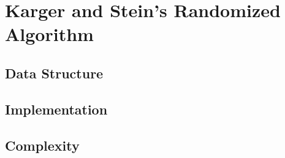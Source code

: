 \section{Karger and Stein's Randomized Algorithm}\label{karger}


\subsection{Data Structure}


\subsection{Implementation}



\subsection{Complexity}



\pagebreak
